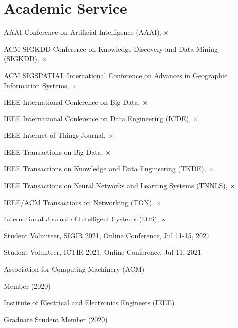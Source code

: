 \section*{Academic Service}


\indent

AAAI Conference on Artificial Intelligence (AAAI), $\times$

ACM SIGKDD Conference on Knowledge Discovery and Data Mining (SIGKDD), $\times$

ACM SIGSPATIAL International Conference on Advances in Geographic Information Systems, $\times$

IEEE International Conference on Big Data, $\times$

IEEE International Conference on Data Engineering (ICDE), $\times$

IEEE Internet of Things Journal, $\times$

IEEE Transactions on Big Data, $\times$

IEEE Transactions on Knowledge and Data Engineering (TKDE), $\times$

IEEE Transactions on Neural Networks and Learning Systems (TNNLS), $\times$

IEEE/ACM Transactions on Networking (TON), $\times$

International Journal of Intelligent Systems (IJIS), $\times$

\indent 

Student Volunteer, SIGIR 2021, Online Conference, Jul 11-15, 2021

Student Volunteer, ICTIR 2021, Online Conference, Jul 11, 2021

\indent 

Association for Computing Machinery (ACM)  

\hspace{2em}Member (2020)

Institute of Electrical and Electronics Engineers (IEEE)

\hspace{2em}Graduate Student Member (2020)